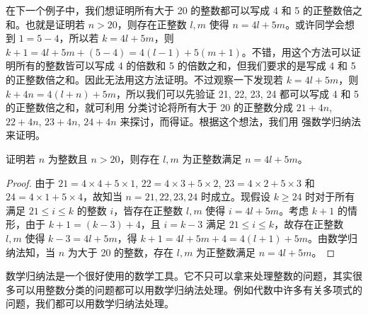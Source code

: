 在下一个例子中，我们想证明所有大于 20 的整数都可以写成 4 和 5 的正整数倍之和。也就是证明若 $n > 20$，则存在正整数 $l, m$ 使得 $n = 4l + 5m$。或许同学会想到 $1 = 5 - 4$，所以若 $k = 4l + 5m$，则 $k + 1 = 4l + 5m + (5 - 4) = 4(l - 1) + 5(m + 1)$。不错，用这个方法可以证明所有的整数皆可以写成 4 的倍数和 5 的倍数之和，但我们要求的是写成 4 和 5 的正整数倍之和。因此无法用这方法证明。不过观察一下发现若 $k = 4l + 5m$，则 $k + 4n = 4(l + n) + 5m$，所以我们可以先验证 21, 22, 23, 24 都可以写成 4 和 5 的正整数倍之和，就可利用 分类讨论将所有大于 20 的正整数分成 $21 + 4n$, $22 + 4n$, $23 + 4n$, $24 + 4n$ 来探讨，而得证。根据这个想法，我们用 强数学归纳法 来证明。

\begin{example}
证明若 $n$ 为整数且 $n > 20$，则存在 $l, m$ 为正整数满足 $n = 4l + 5m$。
\end{example}

\begin{proof}
由于 $21 = 4 \times 4 + 5 \times 1$, $22 = 4 \times 3 + 5 \times 2$, $23 = 4 \times 2 + 5 \times 3$ 和 $24 = 4 \times 1 + 5 \times 4$，故知当 $n = 21, 22, 23, 24$ 时成立。现假设 $k \ge 24$ 时对于所有满足 $21 \le i \le k$ 的整数 $i$，皆存在正整数 $l, m$ 使得 $i = 4l + 5m$。考虑 $k + 1$ 的情形，由于 $k + 1 = (k - 3) + 4$，且 $i = k - 3$ 满足 $21 \le i \le k$，故存在正整数 $l, m$ 使得 $k - 3 = 4l + 5m$，得 $k + 1 = 4l + 5m + 4 = 4(l + 1) + 5m$。由数学归纳法知，当 $n$ 为大于 20 的整数，存在 $l, m$ 为正整数满足 $n = 4l + 5m$。
\end{proof}

数学归纳法是一个很好使用的数学工具。它不只可以拿来处理整数的问题，其实很多可以用整数分类的问题都可以用数学归纳法处理。例如代数中许多有关多项式的问题，我们都可以用数学归纳法处理。

